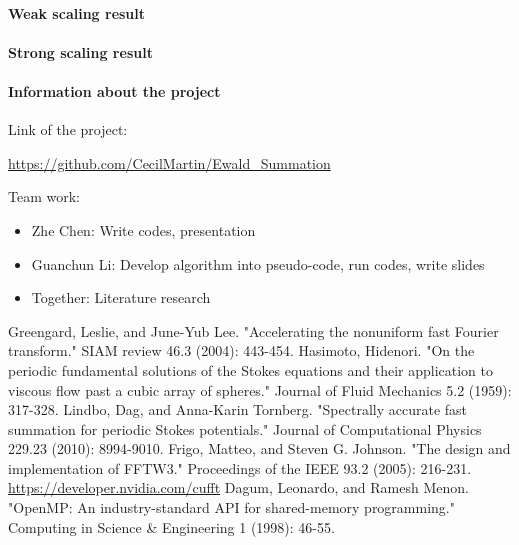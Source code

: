 \documentclass{article}[12pt]
\begin{document}
\paragraph{Weak scaling result}

\paragraph{Strong scaling result}

\paragraph{Information about the project} 
Link of the project: 

\url{https://github.com/CecilMartin/Ewald_Summation}

Team work:
\begin{itemize}
	\item Zhe Chen: Write codes, presentation
	\item Guanchun Li:  Develop algorithm into pseudo-code, run codes, write slides
	\item Together: Literature research
\end{itemize}

\begin{thebibliography}{0}
	Greengard, Leslie, and June-Yub Lee. "Accelerating the nonuniform fast Fourier transform." SIAM review 46.3 (2004): 443-454.
	Hasimoto, Hidenori. "On the periodic fundamental solutions of the Stokes equations and their application to viscous flow past a cubic array of spheres." Journal of Fluid Mechanics 5.2 (1959): 317-328.
	Lindbo, Dag, and Anna-Karin Tornberg. "Spectrally accurate fast summation for periodic Stokes potentials." Journal of Computational Physics 229.23 (2010): 8994-9010.
	Frigo, Matteo, and Steven G. Johnson. "The design and implementation of FFTW3." Proceedings of the IEEE 93.2 (2005): 216-231.
	\url{https://developer.nvidia.com/cufft}
	Dagum, Leonardo, and Ramesh Menon. "OpenMP: An industry-standard API for shared-memory programming." Computing in Science \& Engineering 1 (1998): 46-55.
\end{thebibliography}
\end{document}
